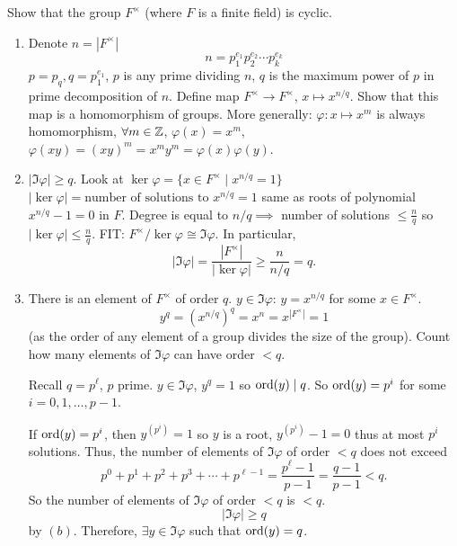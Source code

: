 \documentclass[10pt, a4paper]{article}
\begin{document}
\begin{problem}
    Show that the group $F ^ {\times}$
    (where $F$ is a finite field)
    is cyclic.
    
    \begin{solution}
        \begin{enumerate}[label = (\alph*)]
            \item Denote $n = |F ^ {\times}|$
            \[
            n = p_1 ^ {e_1}p_2 ^ {e_2} \dotsi p_k ^ {e_k}
            \]
            $p = p_q, q = p_1 ^ {e_1}$,
            $p$ is any prime dividing $n$,
            $q$ is the maximum power of $p$ in prime decomposition of $n$.
            Define map $F ^ {\times} \to F ^ {\times}$,
            $x \mapsto x ^ {n / q}$.
            Show that this map is a homomorphism of groups.
            More generally:
            $\varphi : x \mapsto x ^ m$ is always homomorphism,
            $\forall m \in \mathbb{Z}$,
            $\varphi(x) = x ^ m$,
            $\varphi(xy) = (xy) ^ m = x ^ my ^ m = \varphi(x)\varphi(y)$.
    
            \item $|\Im{\varphi}| \geq q$.
            Look at $\ker{\varphi} = \{x \in F ^ {\times} \mid x ^ {n / q} = 1\}$
            $|\ker{\varphi}| = \text{number of solutions to $x ^ {n / q} = 1$}$ same as roots of polynomial $x ^ {n / q} - 1 = 0$ in $F$.
            Degree is equal to $n / q \implies$ number of solutions $\leq \frac{n}{q}$ so $|\ker{\varphi}| \leq \frac{n}{q}$.
            FIT:
            $F ^ {\times} / \ker{\varphi} \cong \Im{\varphi}$.
            In particular,
            \[
            |\Im{\varphi}| = \frac{|F ^ {\times}|}{|\ker{\varphi}|} \geq \frac{n}{n / q} = q.
            \]

            \item There is an element of $F ^ {\times}$ of order $q$.
            $y \in \Im{\varphi}$:
            $y = x ^ {n / q}$ for some $x \in F ^ {\times}$.
            \[
            y ^ q = (x ^ {n / q}) ^ q = x ^ n = x ^ {|F ^ {\times}|} = 1
            \]
            (as the order of any element of a group divides the size of the group).
            Count how many elements of $\Im{\varphi}$ can have order $< q$.

            Recall $q = p ^ {\ell}$,
            $p$ prime.
            $y \in \Im{\varphi}$,
            $y ^ q = 1$ so $\operatorname{ord}(y) \mid q$.
            So $\operatorname{ord}(y) = p ^ i$ for some $i = 0, 1, \dotsc, p - 1$.
            
            If $\operatorname{ord}(y) = p ^ i$,
            then $y ^ {(p ^ i)} = 1$ so $y$ is a root,
            $y ^ {(p ^ i)} - 1 = 0$ thus at most $p ^ i$ solutions.
            Thus,
            the number of elements of $\Im{\varphi}$ of order $< q$ does not exceed
            \[
            p ^ 0 + p ^ 1 + p ^ 2 + p ^ 3 + \dotsi + p ^ {\ell - 1} = \frac{p ^ {\ell} - 1}{p - 1} = \frac{q - 1}{p - 1} < q.
            \]
            So the number of elements of $\Im{\varphi}$ of order $< q$ is $< q$.
            \[
            |\Im{\varphi}| \geq q
            \]
            by $(b)$.
            Therefore,
            $\exists y \in \Im{\varphi}$ such that $\operatorname{ord}(y) = q$.


\end{enumerate}
\end{solution}
\end{problem}
\end{document}
